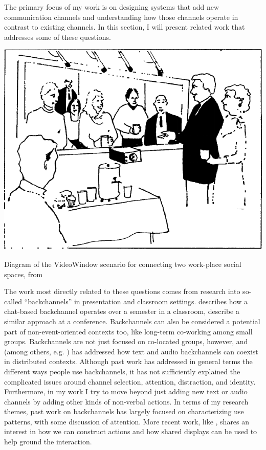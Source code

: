 \documentclass{tufte-handout}
\begin{document}
The primary focus of my work is on designing systems that add new communication channels and understanding how those channels operate in contrast to existing channels. In this section, I will present related work that addresses some of these questions.

\begin{marginfigure}
	\includegraphics{figures/videowindow.png}
	\caption{Diagram of the VideoWindow scenario for connecting two work-place social spaces, from \citep{Fish:1990fn}}
	\label{fig:videowindow}
\end{marginfigure}

The work most directly related to these questions comes from research into so-called ``backchannels'' in presentation and classroom settings. \citet{Yardi:2006uk} describes how a chat-based backchannel operates over a semester in a classroom, \citet{mccarthy_digital_2004} describe a similar approach at a conference. Backchannels can also be considered a potential part of non-event-oriented contexts too, like long-term co-working among small groups. \citep{Huang:2003ef} Backchannels are not just focused on co-located groups, however, and \citet{kellogg_leveraging_2006} (among others, e.g.  \citep{Yankelovich:2005bx}) has addressed how text and audio backchannels can coexist in distributed contexts. Although past work has addressed in general terms the different ways people use backchannels, it has not sufficiently explained the complicated issues around channel selection, attention, distraction, and identity. Furthermore, in my work I try to move beyond just adding new text or audio channels by adding other kinds of non-verbal actions. In terms of my research themes, past work on backchannels has largely focused on characterizing use patterns, with some discussion of attention. More recent work, like \citep{Bergstrom:2011wl}, shares an interest in how we can construct actions and how shared displays can be used to help ground the interaction.
\end{document}
